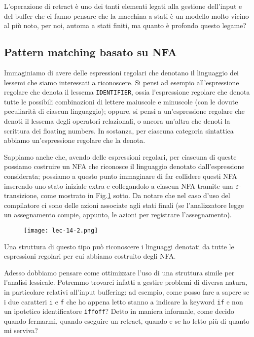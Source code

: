 \documentclass[class=book, crop=false, oneside, 12pt]{standalone}
\begin{document}
L'operazione di retract è uno dei tanti elementi legati alla gestione dell'input e del buffer che ci fanno pensare che la macchina a stati è un modello molto vicino al più noto, per noi, automa a stati finiti, ma quanto è profondo questo legame?

\subsection{Pattern matching basato su NFA}
Immaginiamo di avere delle espressioni regolari che denotano il linguaggio dei lessemi che siamo interessati a riconoscere. Si pensi ad esempio all'espressione regolare che denota il lessema \texttt{IDENTIFIER}, ossia l'espressione regolare che denota tutte le possibili combinazioni di lettere maiuscole e minuscole (con le dovute peculiarità di ciascun linguaggio); oppure, si pensi a un'espressione regolare che denoti il lessema degli operatori relazionali, o ancora un'altra che denoti la scrittura dei floating numbers. In sostanza, per ciascuna categoria sintattica abbiamo un'espressione regolare che la denota.

Sappiamo anche che, avendo delle espressioni regolari, per ciascuna di queste possiamo costruire un NFA che riconosce il linguaggio denotato dall'espressione considerata; possiamo a questo punto immaginare di far collidere questi NFA inserendo uno stato iniziale extra e collegandolo a ciascun NFA tramite una \(\varepsilon\)-transizione, come mostrato in Fig.\ref{nfa_for_grammar_regular_expressions} sotto.
Da notare che nel caso d'uso del compilatore ci sono delle azioni associate agli stati finali (se l'analizzatore legge un assegnamento compie, appunto, le azioni per registrare l'assegnamento).
\begin{figure}[H]
    \centering
    \texttt{[image: lec-14-2.png]}
    \caption{}
    \label{nfa_for_grammar_regular_expressions}
\end{figure}
Una struttura di questo tipo può riconoscere i linguaggi denotati da tutte le espressioni regolari per cui abbiamo costruito degli NFA. 

Adesso dobbiamo pensare come ottimizzare l'uso di una struttura simile per l'analisi lessicale. Potremmo trovarci infatti a gestire problemi di diversa natura, in particolare relativi all'input buffering: ad esempio, come posso fare a sapere se i due caratteri \texttt{i} e \texttt{f} che ho appena letto stanno a indicare la keyword \texttt{if} e non un ipotetico identificatore \texttt{iffoff}? Detto in maniera informale, come decido quando fermarmi, quando eseguire un retract, quando e se ho letto più di quanto mi serviva?
\end{document}
